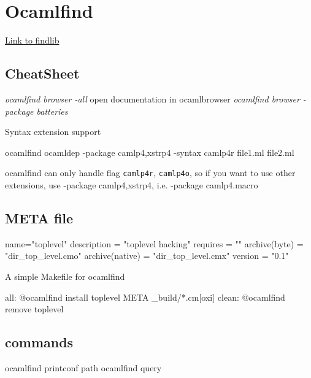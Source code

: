 \section{Ocamlfind}

\href{http://projects.camlcity.org/projects/dl/findlib-1.2.3/doc/ref-html/r17.html}{Link  to findlib}

\subsection{CheatSheet}

\begin{bashcode}
\emph{ocamlfind browser -all } open documentation in ocamlbrowser 
\emph{ocamlfind browser -package batteries}
\end{bashcode}

Syntax extension support  

\begin{bashcode}
ocamlfind ocamldep -package camlp4,xstrp4 -syntax camlp4r file1.ml file2.ml 
\end{bashcode}
ocamlfind can only handle flag \verb|camlp4r|, \verb|camlp4o|, so if
you want to use other extensions, use -package camlp4,xstrp4,
i.e. -package camlp4.macro
  


\subsection{META file}

\begin{bashcode}
name="toplevel"
description = "toplevel hacking"
requires = ""
archive(byte) = "dir_top_level.cmo"
archive(native) = "dir_top_level.cmx"
version = "0.1"
\end{bashcode}


A simple Makefile for ocamlfind 

\begin{bashcode}
all:
	   @ocamlfind install toplevel META _build/*.cm[oxi]
clean: 
	   @ocamlfind remove toplevel 
\end{bashcode}

\subsection{commands}
\begin{bashcode}
  ocamlfind printconf path
  ocamlfind query 
\end{bashcode}  
